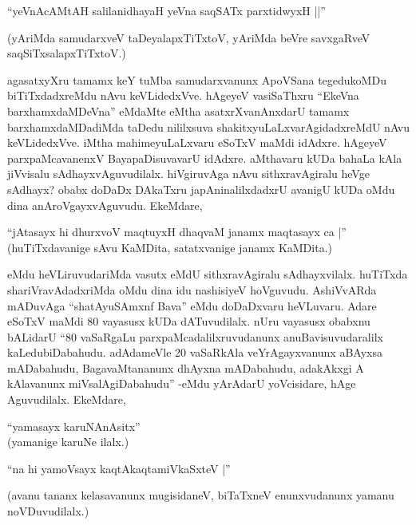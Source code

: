 \begin{shloka}
``yeVnAcAMtAH salilanidhayaH yeVna saqSATx parxtidwyxH ||''
\end{shloka}

(yAriMda samudarxveV taDeyalapxTiTxtoV, yAriMda beVre savxgaRveV saqSiTxsalapxTiTxtoV.)

agasatxyXru tamamx keY tuMba samudarxvanunx ApoVSana tegedukoMDu biTiTxdadxreMdu nAvu keVLidedxVve. hAgeyeV vasiSaThxru ``EkeVna barxhamxdaMDeVna'' eMdaMte eMtha asatxrXvanAnxdarU tamamx barxhamxdaMDadiMda taDedu nililxsuva shakitxyuLaLxvarAgidadxreMdU nAvu keVLidedxVve. iMtha mahimeyuLaLxvaru eSoTxV maMdi idAdxre. hAgeyeV parxpaMcavanenxV BayapaDisuvavarU idAdxre. aMthavaru kUDa bahaLa kAla jiVvisalu sAdhayxvAguvudilalx. hiVgiruvAga nAvu sithxravAgiralu heVge sAdhayx? obabx doDaDx DAkaTxru japAninalilxdadxrU avanigU kUDa oMdu dina anAroVgayxvAguvudu. EkeMdare,

\begin{shloka}
``jAtasayx hi dhurxvoV maqtuyxH dhaqvaM janamx maqtasayx ca |''\\
(huTiTxdavanige sAvu KaMDita, satatxvanige janamx KaMDita.)
\end{shloka}

\noindent eMdu heVLiruvudariMda vasutx eMdU sithxravAgiralu sAdhayxvilalx. huTiTxda shariVravAdadxriMda oMdu dina idu nashisiyeV hoVguvudu. AshiVvARda mADuvAga ``shatAyuSAmxnf Bava'' eMdu doDaDxvaru heVLuvaru. Adare eSoTxV maMdi 80 vayasusx kUDa dATuvudilalx. nUru vayasusx obabxnu bALidarU ``80 vaSaRgaLu parxpaMcadalilxruvudanunx anuBavisuvudaralilx kaLedubiDabahudu. adAdameVle 20 vaSaRkAla veYrAgayxvanunx aBAyxsa mADabahudu, BagavaMtananunx dhAyxna mADabahudu, adakAkxgi A kAlavanunx miVsalAgiDabahudu'' -eMdu yArAdarU yoVcisidare, hAge Aguvudilalx. EkeMdare,

\begin{shloka}
``yamasayx karuNAnAsitx''\\
(yamanige karuNe ilalx.)
\end{shloka}

\begin{shloka}
``na hi yamoV\s sayx kaqtAkaqtamiVkaSxteV |''
\end{shloka}

(avanu tananx kelasavanunx mugisidaneV, biTaTxneV enunxvudanunx yamanu noVDuvudilalx.)

